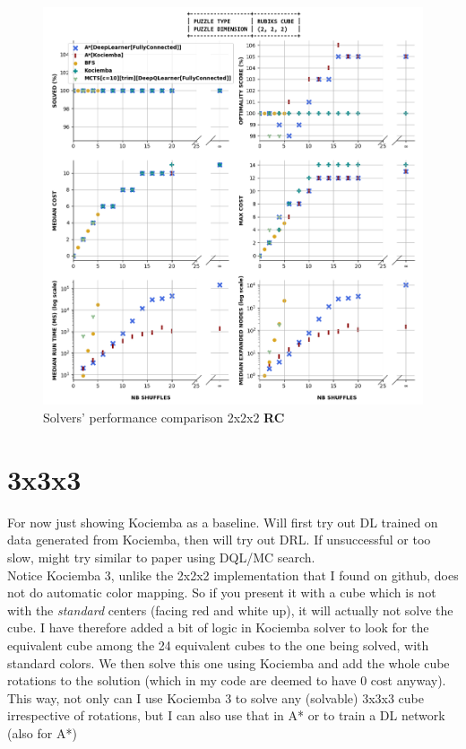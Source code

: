 \begin{figure}[H]
\centering
\includegraphics[scale=0.60]{./Figures/222RCPerformance}
\caption[222RCPerformance]{Solvers' performance comparison 2x2x2 \textbf{RC}}
\label{fig:222RCPerformance}
\end{figure}



\section{3x3x3}

For now just showing Kociemba as a baseline. Will first try out DL trained on data generated from Kociemba, then will try out DRL. If unsuccessful or too slow, might try similar to paper using DQL/MC search.
\\
Notice Kociemba 3, unlike the 2x2x2 implementation that I found on github, does not do automatic color mapping. So if you present it with a cube which is not with the \textit{standard} centers (facing red and white up), it will actually not solve the cube. I have therefore added a bit of logic in Kociemba solver to look for the equivalent cube among the 24 equivalent cubes to the one being solved, with standard colors. We then solve this one using Kociemba and add the whole cube rotations to the solution (which in my code are deemed to have 0 cost anyway). This way, not only can I use Kociemba 3 to solve any (solvable) 3x3x3 cube irrespective of rotations, but I can also use that in A* or to train a DL network (also for A*)




